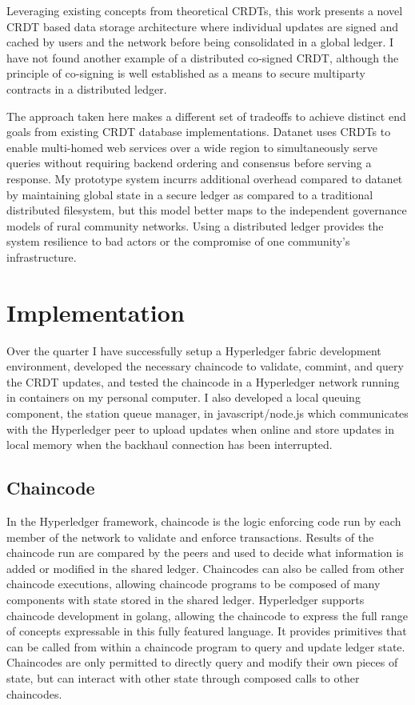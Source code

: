 Leveraging existing concepts from theoretical
CRDTs\cite{ShapiroConflictfreereplicateddata2011}, this work presents
a novel CRDT based data storage architecture where individual updates
are signed and cached by users and the network before being
consolidated in a global ledger. I have not found another example of a
distributed co-signed CRDT, although the principle of co-signing is
well established as a means to secure multiparty contracts in a
distributed ledger.

The approach taken here makes a different set of tradeoffs to achieve
distinct end goals from existing CRDT database
implementations.\cite{DatanetNewCRDT16} Datanet uses CRDTs to enable
multi-homed web services over a wide region to simultaneously serve
queries without requiring backend ordering and consensus before
serving a response. My prototype system incurrs additional overhead
compared to datanet by maintaining global state in a secure ledger as
compared to a traditional distributed filesystem, but this model
better maps to the independent governance models of rural community
networks. Using a distributed ledger provides the system resilience to
bad actors or the compromise of one community's infrastructure. 

\section{Implementation}

Over the quarter I have successfully setup a Hyperledger fabric
development environment, developed the necessary chaincode to
validate, commint, and query the CRDT updates, and tested the
chaincode in a Hyperledger network running in containers on my
personal computer. I also developed a local queuing component, the
station queue manager, in javascript/node.js which communicates with
the Hyperledger peer to upload updates when online and store updates
in local memory when the backhaul connection has been interrupted.

\subsection{Chaincode}

In the Hyperledger framework, chaincode is the logic enforcing code
run by each member of the network to validate and enforce
transactions. Results of the chaincode run are compared by the peers
and used to decide what information is added or modified in the shared
ledger. Chaincodes can also be called from other chaincode executions,
allowing chaincode programs to be composed of many components with
state stored in the shared ledger. Hyperledger supports chaincode
development in golang, allowing the chaincode to express the full
range of concepts expressable in this fully featured language. It
provides primitives that can be called from within a chaincode program
to query and update ledger state. Chaincodes are only permitted to
directly query and modify their own pieces of state, but can interact
with other state through composed calls to other chaincodes.

